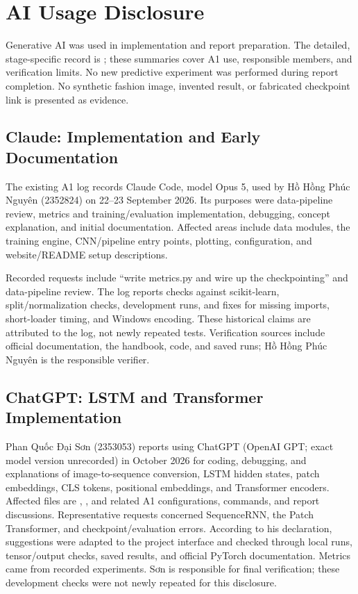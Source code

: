 \section*{AI Usage Disclosure}

Generative AI was used in implementation and report preparation. The detailed, stage-specific record is ; these summaries cover A1 use, responsible members, and verification limits. No new predictive experiment was performed during report completion. No synthetic fashion image, invented result, or fabricated checkpoint link is presented as evidence.

\subsection*{Claude: Implementation and Early Documentation}

The existing A1 log records Claude Code, model Opus 5, used by Hồ Hồng Phúc Nguyên (2352824) on 22--23 September 2026. Its purposes were data-pipeline review, metrics and training/evaluation implementation, debugging, concept explanation, and initial documentation. Affected areas include data modules, the training engine, CNN/pipeline entry points, plotting, configuration, and website/README setup descriptions.

Recorded requests include “write metrics.py and wire up the checkpointing” and data-pipeline review. The log reports checks against scikit-learn, split/normalization checks, development runs, and fixes for missing imports, short-loader timing, and Windows encoding. These historical claims are attributed to the log, not newly repeated tests. Verification sources include official documentation, the handbook, code, and saved runs; Hồ Hồng Phúc Nguyên is the responsible verifier.

\subsection*{ChatGPT: LSTM and Transformer Implementation}

Phan Quốc Đại Sơn (2353053) reports using ChatGPT (OpenAI GPT; exact model version unrecorded) in October 2026 for coding, debugging, and explanations of image-to-sequence conversion, LSTM hidden states, patch embeddings, CLS tokens, positional embeddings, and Transformer encoders. Affected files are , , and related A1 configurations, commands, and report discussions. Representative requests concerned SequenceRNN, the Patch Transformer, and checkpoint/evaluation errors. According to his declaration, suggestions were adapted to the project interface and checked through local runs, tensor/output checks, saved results, and official PyTorch documentation. Metrics came from recorded experiments. Sơn is responsible for final verification; these development checks were not newly repeated for this disclosure.

